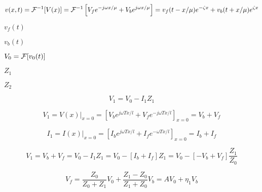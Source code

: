 {\newpage\clearpage
{}%
\begin{displaymath}  v(x,t)={\cal F}^{-1}[V(x)]={\cal F}^{-1}\left[V_f e^{-j\omega x/\mu}+V_b e^{j\omega x/\mu}\right]
=v_f(t-x/\mu)e^{-\zeta x}+v_b(t+x/\mu) e^{\zeta x}
\end{displaymath}%
\lthtmldisplayZ
\lthtmlcheckvsize\clearpage}

{\newpage\clearpage
{}%
$v_f(t)$%
\lthtmlinlinemathZ
\lthtmlcheckvsize\clearpage}

{\newpage\clearpage
{}%
$v_b(t)$%
\lthtmlinlinemathZ
\lthtmlcheckvsize\clearpage}

{\newpage\clearpage
{}%
$V_0={\cal F}[v_0(t)]$%
\lthtmlinlinemathZ
\lthtmlcheckvsize\clearpage}

{\newpage\clearpage
{}%
$Z_1$%
\lthtmlinlinemathZ
\lthtmlcheckvsize\clearpage}

{\newpage\clearpage
{}%
$Z_2$%
\lthtmlinlinemathZ
\lthtmlcheckvsize\clearpage}

{\newpage\clearpage
{}%
\begin{displaymath}	V_1=V_0-I_1Z_1	\end{displaymath}%
\lthtmldisplayZ
\lthtmlcheckvsize\clearpage}

{\newpage\clearpage
{}%
\begin{displaymath} V_1=V(x)|_{x=0}=\left[V_be^{j\omega Tx/l}+V_fe^{-j\omega Tx/l}\right]_{x=0}=V_b+V_f \end{displaymath}%
\lthtmldisplayZ
\lthtmlcheckvsize\clearpage}

{\newpage\clearpage
{}%
\begin{displaymath} I_1=I(x)|_{x=0}=\left[I_be^{j\omega Tx/l}+I_fe^{-\omega Tx/l}\right]_{x=0}=I_b+I_f \end{displaymath}%
\lthtmldisplayZ
\lthtmlcheckvsize\clearpage}

{\newpage\clearpage
{}%
\begin{displaymath} V_1=V_b+V_f=V_0-I_1Z_1=V_0-[I_b+I_f]Z_1
  =V_0-[-V_b+V_f]\frac{Z_1}{Z_0}	\end{displaymath}%
\lthtmldisplayZ
\lthtmlcheckvsize\clearpage}

{\newpage\clearpage
{}%
\begin{displaymath}V_f=\frac{Z_0}{Z_0+Z_1}V_0+\frac{Z_1-Z_0}{Z_1+Z_0}V_b
  =AV_0+\eta_1V_b	\end{displaymath}%
\lthtmldisplayZ
\lthtmlcheckvsize\clearpage}

